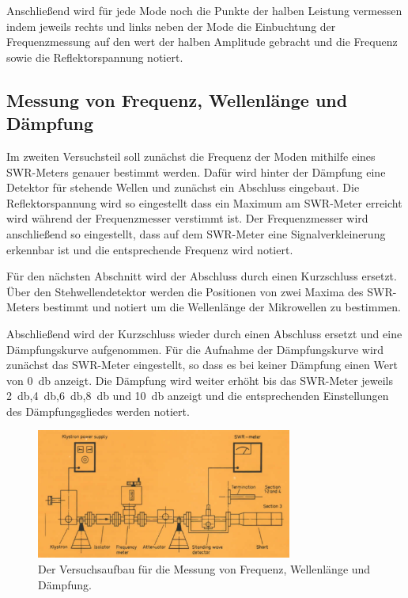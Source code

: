         Anschließend wird für jede Mode noch die Punkte der halben Leistung vermessen indem jeweils rechts und links neben der Mode die Einbuchtung der Frequenzmessung auf den wert der halben Amplitude gebracht und die Frequenz sowie die Reflektorspannung notiert.
    \subsection{Messung von Frequenz, Wellenlänge und Dämpfung}
        Im zweiten Versuchsteil soll zunächst die Frequenz der Moden mithilfe eines SWR-Meters genauer bestimmt werden.
        Dafür wird hinter der Dämpfung eine Detektor für stehende Wellen und zunächst ein Abschluss eingebaut.
        Die Reflektorspannung wird so eingestellt dass ein Maximum am SWR-Meter erreicht wird während der Frequenzmesser verstimmt ist.
        Der Frequenzmesser wird anschließend so eingestellt, dass auf dem SWR-Meter eine Signalverkleinerung erkennbar ist und die entsprechende Frequenz wird notiert.

        Für den nächsten Abschnitt wird der Abschluss durch einen Kurzschluss ersetzt.
        Über den Stehwellendetektor werden die Positionen von zwei Maxima des SWR-Meters bestimmt und notiert um die Wellenlänge der Mikrowellen zu bestimmen.

        Abschließend wird der Kurzschluss wieder durch einen Abschluss ersetzt und eine Dämpfungskurve aufgenommen.
        Für die Aufnahme der Dämpfungskurve wird zunächst das SWR-Meter eingestellt, so dass es bei keiner Dämpfung einen Wert von \SI{0}{\decibel} anzeigt.
        Die Dämpfung wird weiter erhöht bis das SWR-Meter jeweils \SI{2}{\decibel},\SI{4}{\decibel},\SI{6}{\decibel},\SI{8}{\decibel} und \SI{10}{\decibel} anzeigt und die entsprechenden Einstellungen des Dämpfungsgliedes werden notiert.
        \begin{figure}[H]
            \centering
            \includegraphics[width = 0.75\textwidth]{bilder/Aufbau_Teil2.png}
            \caption{Der Versuchsaufbau für die Messung von Frequenz, Wellenlänge und Dämpfung.}
            \label{fig:Teil2}
        \end{figure}
